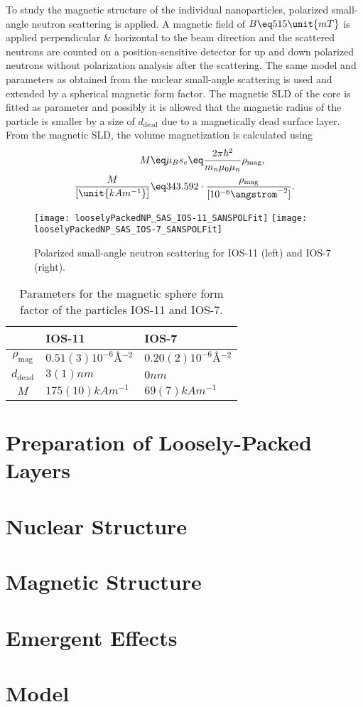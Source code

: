 \documentclass[\main/dresen_thesis.tex]{subfiles}
\begin{document}
To study the magnetic structure of the individual nanoparticles, polarized small-angle neutron scattering is applied.
A magnetic field of $B\eq 515 \unit{mT}$ is applied perpendicular \& horizontal to the beam direction and the scattered neutrons are counted on a position-sensitive detector for up and down polarized neutrons without polarization analysis after the scattering.
The same model and parameters as obtained from the nuclear small-angle scattering is used and extended by a spherical magnetic form factor.
The magnetic SLD of the core is fitted as parameter and possibly it is allowed that the magnetic radius of the particle is smaller by a size of $d_\mathrm{dead}$ due to a magnetically dead surface layer.
From the magnetic SLD, the volume magnetization is calculated using 
\begin{align}
  M \eq& \mu_B s_e \eq \frac{2 \pi \hbar^2}{m_n \mu_0 \mu_n} \rho_\mathrm{mag},\\
  \frac{M}{[\unit{kA m^{-1}}]} \eq& 343.592 \cdot \frac{\rho_\mathrm{mag}}{[10^{-6} \angstrom^{-2}]}.
\end{align}

\begin{figure}[tb]
  \centering
  \texttt{[image: looselyPackedNP\_SAS\_IOS-11\_SANSPOLFit]}
  \texttt{[image: looselyPackedNP\_SAS\_IOS-7\_SANSPOLFit]}
  \caption{\label{fig:looselyPackedNP:nanoparticle:sanspol}Polarized small-angle neutron scattering for IOS-11 (left) and IOS-7 (right).}
\end{figure}

\begin{table}[tb]
  \centering
  \caption{\label{tab:looselyPackedNP:nanoparticle:sanspol}Parameters for the magnetic sphere form factor of the particles IOS-11 and IOS-7.}
  \begin{tabular}{ c | l | l }
      & IOS-11 & IOS-7 \\
    \hline
    $\rho_\mathrm{mag}$
      & $0.51(3) \unit{10^{-6} \angstrom^{-2}}$
      & $0.20(2) \unit{10^{-6} \angstrom^{-2}}$\\
    $d_\mathrm{dead}$
      & $3(1) \unit{nm}$
      & $0 \unit{nm}$\\
    \hline
    $M$
    & $175(10) \unit{kAm^{-1}}$
    & $69(7) \unit{kAm^{-1}}$\\
    \hline
  \end{tabular}
\end{table}

\section{Preparation of Loosely-Packed Layers}

\section{Nuclear Structure}

\section{Magnetic Structure}

\section{Emergent Effects}

\section{Model}
\end{document}
